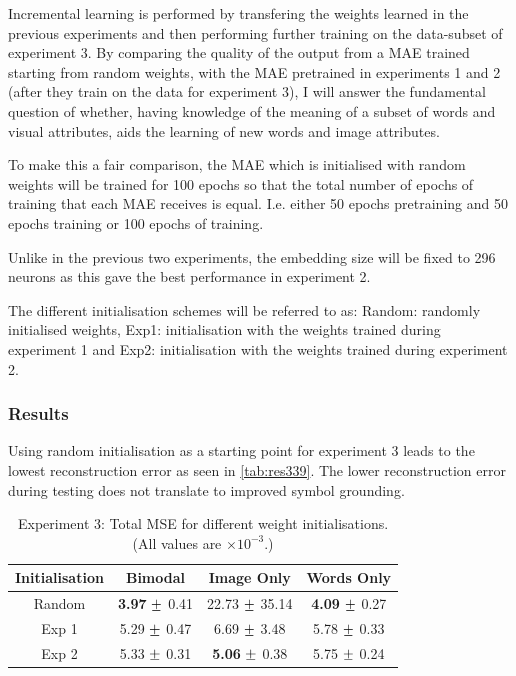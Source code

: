 Incremental learning is performed by transfering the weights learned in the previous experiments and then performing further training on the data-subset of experiment 3. By comparing the quality of the output from a \ac{MAE} trained starting from random weights, with the \ac{MAE} pretrained in experiments 1 and 2 (after they train on the data for experiment 3), I will answer the fundamental question of whether, having knowledge of the meaning of a subset of words and visual attributes, aids the learning of new words and image attributes.

To make this a fair comparison, the MAE which is initialised with random weights will be trained for 100 epochs so that the total number of epochs of training that each \ac{MAE} receives is equal. I.e. either 50 epochs pretraining and 50 epochs training or 100 epochs of training.

Unlike in the previous two experiments, the embedding size will be fixed to 296 neurons as this gave the best performance in experiment 2.

The different initialisation schemes will be referred to as: Random: randomly initialised weights, Exp1: initialisation with the weights trained during experiment 1 and Exp2: initialisation with the weights trained during experiment 2.

\subsubsection{Results}
Using random initialisation as a starting point for experiment 3 leads to the lowest reconstruction error as seen in \autoref{tab:res339}. The lower reconstruction error during testing does not translate to improved symbol grounding.


\begin{table}[h!]
\centering
	\begin{tabular}{|c|c|c|c|}
	\hline
	\textbf{Initialisation} & 	\textbf{Bimodal} & \textbf{Image Only} 	& 	\textbf{Words Only} \\ \hline
	Random	&	\textbf{3.97}	$\mypm$	0.41	&	22.73	$\mypm$	35.14	&	\textbf{4.09}	$\mypm$	0.27\\ \hline
	Exp 1 	&	5.29	$\mypm$	0.47	&	6.69	$\mypm$	3.48	&	5.78	$\mypm$	0.33	\\ \hline
	Exp 2 	&	5.33	$\mypm$	0.31	&	\textbf{5.06}	$\mypm$	0.38	&	5.75	$\mypm$	0.24	\\ \hline

	\end{tabular}
\caption{Experiment 3: Total MSE for different weight initialisations. (All values are $\times10^{-3}$.)}
\label{tab:res339}
\end{table}


